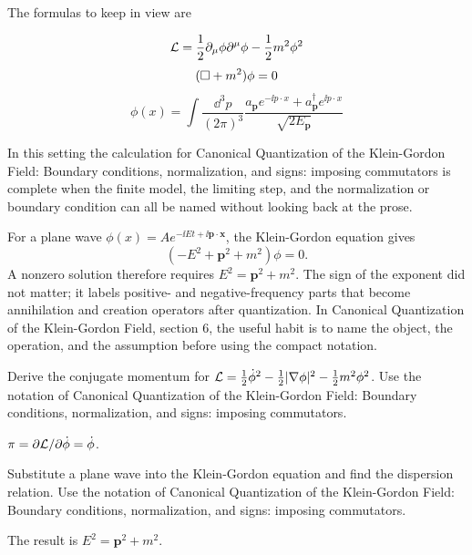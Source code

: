 The formulas to keep in view are

\[
  \mathcal L=\frac12\partial_\mu\phi\partial^\mu\phi-\frac12m^2\phi^2
\]
\[
  (\Box+m^2)\phi=0
\]
\[
  \phi(x)=\int\frac{\dd^3p}{(2\pi)^3}\frac{a_{\bm p}e^{-\ii p\cdot x}+a_{\bm p}^\dagger e^{\ii p\cdot x}}{\sqrt{2E_{\bm p}}}
\]

In this setting the calculation for Canonical Quantization of the Klein-Gordon Field: Boundary conditions, normalization, and signs: imposing commutators is complete when the finite model, the limiting step, and the normalization or boundary condition can all be named without looking back at the prose.




\begin{example}
For a plane wave \(\phi(x)=Ae^{-\ii Et+\ii\bm p\cdot\bm x}\), the Klein-Gordon equation gives
\[
  (-E^2+\bm p^2+m^2)\phi=0.
\]
A nonzero solution therefore requires \(E^2=\bm p^2+m^2\).  The sign of the exponent did not matter; it labels positive- and negative-frequency parts that become annihilation and creation operators after quantization.  In Canonical Quantization of the Klein-Gordon Field, section 6, the useful habit is to name the object, the operation, and the assumption before using the compact notation.
\end{example}



\begin{exercise}
Derive the conjugate momentum for \(\mathcal L=\frac12\dot\phi^2-\frac12|\nabla\phi|^2-\frac12m^2\phi^2\).  Use the notation of Canonical Quantization of the Klein-Gordon Field: Boundary conditions, normalization, and signs: imposing commutators.
\begin{answer}
\(\pi=\partial\mathcal L/\partial\dot\phi=\dot\phi\).
\end{answer}
\end{exercise}

\begin{exercise}
Substitute a plane wave into the Klein-Gordon equation and find the dispersion relation.  Use the notation of Canonical Quantization of the Klein-Gordon Field: Boundary conditions, normalization, and signs: imposing commutators.
\begin{answer}
The result is \(E^2=\bm p^2+m^2\).
\end{answer}
\end{exercise}



